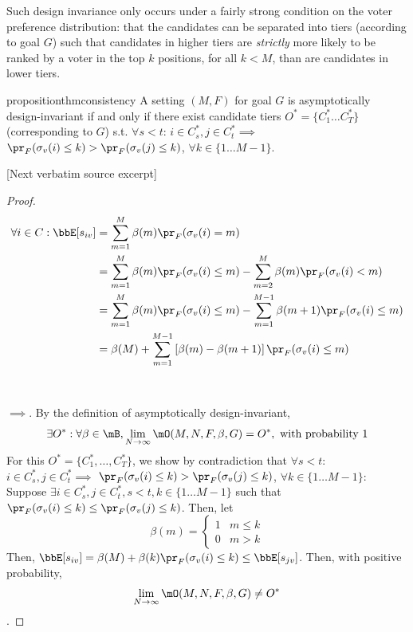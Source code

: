 \documentclass[10pt]{article}
\begin{document}
\begin{ReviewVerbatim}
Such design invariance only occurs under a fairly strong condition on the voter preference distribution: that the candidates can be separated into tiers (according to goal $G$) such that candidates in higher tiers are \textit{strictly} more likely to be ranked by a voter in the top $k$ positions, for all $k<M$, than are candidates in lower tiers.

\begin{restatable}{proposition}{thmconsistency}
	\label{thm:consistency}
	A setting $(M, F)$ for goal $G$ is asymptotically design-invariant if and only if there exist candidate tiers $O^* = \{C_1^*\dots C_T^*\}$ (corresponding to $G$) s.t. $\forall s<t$: $i \in C^*_s, j\in C^*_t \implies$ $\pr_F(\sigma_v(i) \leq k) > \pr_F(\sigma_v(j) \leq k)$, $\forall k\in\{1 \dots M-1 \}$.
\end{restatable}

[Next verbatim source excerpt]

\thmconsistency*
%
\begin{proof}
	\begin{align*}
	\forall i \in C: \bbE[s_{iv}]
	&= \sum_{m = 1}^M \beta(m) \pr_F(\sigma_v(i) = m)\\
	&= \sum_{m = 1}^M \beta(m) \pr_F(\sigma_v(i) \leq m) - \sum_{m = 2}^M \beta(m) \pr_F(\sigma_v(i) < m) \\
	&= \sum_{m = 1}^M \beta(m) \pr_F(\sigma_v(i) \leq m) - \sum_{m = 1}^{M-1} \beta(m+1) \pr_F(\sigma_v(i) \leq m) \\
	&= \beta(M) + \sum_{m = 1}^{M-1} \left[ \beta(m)- \beta(m+1)\right] \pr_F(\sigma_v(i) \leq m)
	\end{align*}
	~\\\\	$\implies$. By the definition of asymptotically design-invariant, 	$$ \exists O^*: \forall \beta \in \mB, \lim_{N \to \infty} \mO(M, N, F, \beta, G) = O^*, \text{ with probability } 1 $$
	For this $O^* = \{C_1^*, \dots, C_T^*\}$, we show by contradiction that $\forall s<t$: $i \in C^*_s, j\in C^*_t \implies$ $\pr_F(\sigma_v(i) \leq k) > \pr_F(\sigma_v(j) \leq k)$, $\forall k\in\{1 \dots M-1 \}$: Suppose $\exists i \in C^*_s, j\in C^*_t, s<t, k \in \{1 \dots M-1 \}$ such that $\pr_F(\sigma_v(i)\leq k) \leq \pr_F(\sigma_v(j)\leq k)$. Then, let
	$$\beta(m) = \begin{cases} 1 & m \leq k \\
	0 & m > k
	\end{cases}$$
	Then, $\bbE[s_{iv}] = \beta(M) + \beta(k)\pr_F(\sigma_v(i)\leq k) \leq \bbE[s_{jv}]$. Then, with positive probability, $$\lim_{N \to \infty} \mO(M, N, F, \beta, G) \neq O^*$$.


\end{proof}
\end{ReviewVerbatim}
\end{document}
